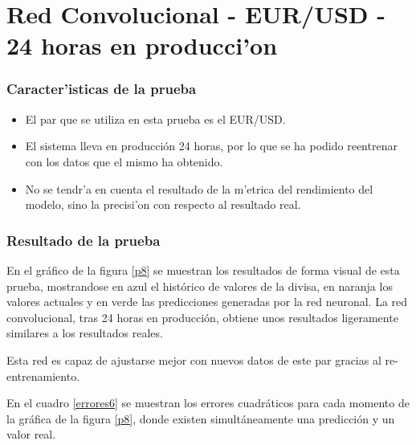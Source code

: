 \clearpage



\section{Red Convolucional - EUR/USD - 24 horas en producci'on}\label{sec:pruebarecbaja_5}


\subsubsection*{Caracter'isticas de la prueba}
\begin{itemize}
\item El par que se utiliza en esta prueba es el EUR/USD.
\item El sistema lleva en producción 24 horas, por lo que se ha podido reentrenar con los datos que el mismo  ha obtenido. 
\item No se tendr'a en cuenta el resultado de la m'etrica del rendimiento del modelo, sino la precisi'on con respecto al resultado real.
\end{itemize}

\subsubsection*{Resultado de la prueba}

En el gráfico de la figura \ref{p8} se muestran los resultados de forma visual de esta prueba, mostrandose en azul el histórico de valores de la divisa, en naranja los valores actuales y en verde las predicciones generadas por la red neuronal. La red convolucional, tras 24 horas en producción, obtiene unos resultados ligeramente similares a los resultados reales. 

Esta red es capaz de ajustarse mejor con nuevos datos de este par gracias al re-entrenamiento.


En el cuadro  \ref{errores6} se muestran los errores cuadráticos para cada momento de la gráfica de la figura \ref{p8}, donde existen simultáneamente una predicción y un valor real.

